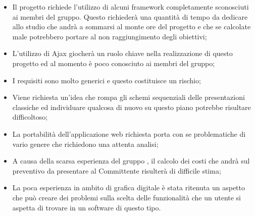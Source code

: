 \begin{itemize}
	\item Il progetto \PROGETTO{} richiede l'utilizzo di alcuni \gls{framework} completamente sconosciuti ai membri del gruppo. Questo richiederà una quantità di tempo da dedicare allo studio che andrà a sommarsi al monte ore del progetto e che se calcolate male potrebbero portare al non raggiungimento degli obiettivi;
	\item L'utilizzo di Ajax giocherà un ruolo chiave nella realizzazione di questo progetto ed al momento è poco conosciuto ai membri del gruppo;
	\item I requisiti sono molto generici e questo costituisce un rischio;
	\item Viene richiesta un'idea che rompa gli schemi sequenziali delle presentazioni classiche ed individuare qualcosa di nuovo su questo piano potrebbe risultare difficoltoso;
	\item La portabilità dell'applicazione web richiesta porta con se problematiche di vario genere che richiedono una attenta analisi;
	\item A causa della scarsa esperienza del gruppo \GRUPPO, il calcolo dei costi che andrà sul preventivo da presentare al Committente risulterà di difficile stima;
	\item La poca esperienza in ambito di grafica digitale è stata ritenuta un aspetto che può creare dei problemi sulla scelta delle funzionalità che un utente si aspetta di trovare in un software di questo tipo.
\end{itemize}

